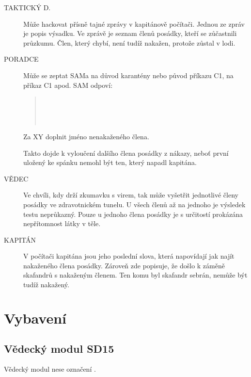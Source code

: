 \documentclass[11pt,oneside,a4paper]{article}
\begin{document}
\begin{description}
\item[TAKTICKÝ D.] Může hackovat přísně tajné zprávy v kapitánově počítači. Jednou ze zpráv je popis výsadku. Ve zprávě je seznam členů posádky, kteří se zůčastnili průzkumu. Člen, který chybí, není tudíž nakažen, protože zůstal v lodi.
\item[PORADCE] Může se zeptat SAMa na důvod karantény nebo původ příkazu C1, na příkaz C1 apod. SAM odpoví:
\begin{quote}
 \\
 \\
\\
\end{quote}
Za XY doplnit jméno nenakaženého člena.
\begin{quote}
\end{quote}
Takto dojde k vyloučení dalšího člena posádky z nákazy, neboť první uložený ke spánku nemohl být ten, který napadl kapitána.
\item[VĚDEC] Ve chvíli, kdy drží zkumavku s virem, tak může vyšetřit jednotlivé členy posádky ve zdravotnickém tunelu. U všech členů až na jednoho je výsledek testu neprůkazný. Pouze u jednoho člena posádky je s určitostí prokázána nepřítomnost látky v těle.
\item[KAPITÁN] V počítači kapitána jsou jeho poslední slova, která napovídají jak najít nakaženého člena posádky. Zároveň zde popisuje, že došlo k záměně skafandrů s nakaženým členem. Ten komu byl skafandr sebrán, nemůže být tudíž nakažený.
\end{description}

\section{\texorpdfstring{Vybavení}{Vybaveni}}
\label{sec:vybaveni}

\subsection{\texorpdfstring{Vědecký modul SD15}{Vedecky modul SD15}}
\label{subsec:SD15}
Vědecký modul nese označení .
\end{document}
